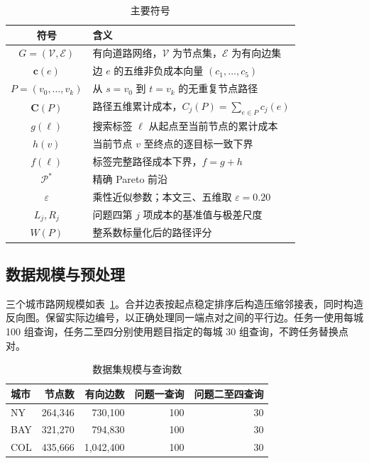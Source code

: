 \documentclass[UTF8,a4paper]{ctexart}
\newcommand{\E}{\mathcal{E}}
\newcommand{\V}{\mathcal{V}}
\newcommand{\eps}{\varepsilon}
\begin{document}
\begin{table}[H]
\centering
\caption{主要符号}
\begin{tabularx}{0.94\textwidth}{cX}
\toprule
符号 & 含义 \\
\midrule
$G=(\V,\E)$ & 有向道路网络，$\V$ 为节点集，$\E$ 为有向边集 \\
$\bm c(e)$ & 边 $e$ 的五维非负成本向量 $(c_1,\ldots,c_5)$ \\
$P=(v_0,\ldots,v_k)$ & 从 $s=v_0$ 到 $t=v_k$ 的无重复节点路径 \\
$\bm C(P)$ & 路径五维累计成本，$C_j(P)=\sum_{e\in P}c_j(e)$ \\
$g(\ell)$ & 搜索标签 $\ell$ 从起点至当前节点的累计成本 \\
$h(v)$ & 当前节点 $v$ 至终点的逐目标一致下界 \\
$f(\ell)$ & 标签完整路径成本下界，$f=g+h$ \\
$\mathcal P^*$ & 精确 Pareto 前沿 \\
$\eps$ & 乘性近似参数；本文三、五维取 $\eps=0.20$ \\
$L_j,R_j$ & 问题四第 $j$ 项成本的基准值与极差尺度 \\
$W(P)$ & 整系数标量化后的路径评分 \\
\bottomrule
\end{tabularx}
\end{table}

\subsection{数据规模与预处理}

三个城市路网规模如表~\ref{tab:data}。合并边表按起点稳定排序后构造压缩邻接表，同时构造反向图。保留实际边编号，以正确处理同一端点对之间的平行边。任务一使用每城 100 组查询，任务二至四分别使用题目指定的每城 30 组查询，不跨任务替换点对。

\begin{table}[H]
\centering
\caption{数据集规模与查询数}
\label{tab:data}
\begin{tabular}{lrrrr}
\toprule
城市 & 节点数 & 有向边数 & 问题一查询 & 问题二至四查询 \\
\midrule
NY  & 264,346 & 730,100   & 100 & 30 \\
BAY & 321,270 & 794,830   & 100 & 30 \\
COL & 435,666 & 1,042,400 & 100 & 30 \\
\bottomrule
\end{tabular}
\end{table}
\end{document}
